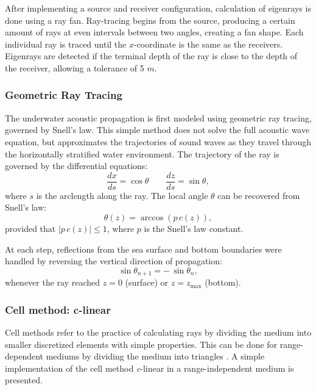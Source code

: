 \documentclass[fleqn]{jaes}
\begin{document}
After implementing a source and receiver configuration, calculation of eigenrays is done using a ray fan. Ray-tracing begins from the source, producing a certain amount of rays at even intervals between two angles, creating a fan shape. Each individual ray is traced until the $x$-coordinate is the same as the receivers. Eigenrays are detected if the terminal depth of the ray is close to the depth of the receiver, allowing a tolerance of 5 $m$.

\subsubsection{Geometric Ray Tracing}
The underwater acoustic propagation is first modeled using geometric ray tracing, governed by Snell's law. This simple method does not solve the full acoustic wave equation, but approximates the trajectories of sound waves as they travel through the horizontally stratified water environment. The trajectory of the ray is governed by the differential equations:
\begin{equation}
    \frac{dx}{ds} = \cos\theta \quad \quad
    \frac{dz}{ds} = \sin\theta,
    \label{eq: dsRelations}
\end{equation}
where $s$ is the arclength along the ray. The local angle $\theta$ can be recovered from Snell's law:
\begin{equation}
    \theta(z) = \arccos\!\left(p\,c(z)\right),
\label{eq:arccosSnell}
\end{equation}
provided that $|p\,c(z)| \leq 1$, where $p$ is the Snell's law constant.

At each step, reflections from the sea surface and bottom boundaries were handled by reversing the vertical direction of propagation:
\begin{equation}
    \sin\theta_{n+1} = -\,\sin\theta_n,
    \label{Perfectreflection}
\end{equation}
whenever the ray reached $z = 0$ (surface) or $z = z_{\text{max}}$ (bottom).

\subsubsection{Cell method: c-linear}
Cell methods refer to the practice of calculating rays by dividing the medium into smaller discretized elements with simple properties. This can be done for range-dependent mediums by dividing the medium into triangles \cite{Jensen}. A simple implementation of the cell method \textit{c}-linear in a range-independent medium is presented.
\end{document}
